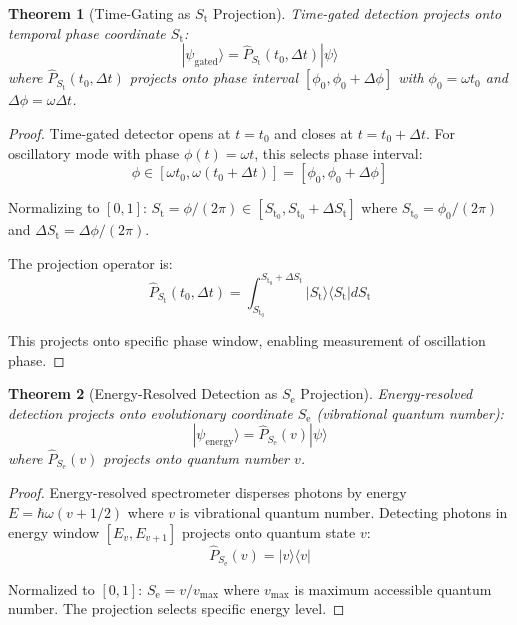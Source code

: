 \documentclass[twocolumn,10pt]{article}
\newtheorem{theorem}{Theorem}[section]
\newcommand{\St}{S_{\text{t}}}
\newcommand{\Se}{S_{\text{e}}}
\begin{document}
\begin{theorem}[Time-Gating as $\St$ Projection]
\label{thm:time_gating_projection}
Time-gated detection projects onto temporal phase coordinate $\St$:
\begin{equation}
|\psi_{\text{gated}}\rangle = \hat{P}_{\St}(t_0, \Delta t) |\psi\rangle
\end{equation}
where $\hat{P}_{\St}(t_0, \Delta t)$ projects onto phase interval $[\phi_0, \phi_0 + \Delta\phi]$ with $\phi_0 = \omega t_0$ and $\Delta\phi = \omega \Delta t$.
\end{theorem}

\begin{proof}
Time-gated detector opens at $t = t_0$ and closes at $t = t_0 + \Delta t$. For oscillatory mode with phase $\phi(t) = \omega t$, this selects phase interval:
\begin{equation}
\phi \in [\omega t_0, \omega(t_0 + \Delta t)] = [\phi_0, \phi_0 + \Delta\phi]
\end{equation}

Normalizing to $[0,1]$: $\St = \phi/(2\pi) \in [\St_0, \St_0 + \Delta\St]$ where $\St_0 = \phi_0/(2\pi)$ and $\Delta\St = \Delta\phi/(2\pi)$.

The projection operator is:
\begin{equation}
\hat{P}_{\St}(t_0, \Delta t) = \int_{\St_0}^{\St_0 + \Delta\St} |\St\rangle\langle\St| d\St
\end{equation}

This projects onto specific phase window, enabling measurement of oscillation phase.
\end{proof}

\begin{theorem}[Energy-Resolved Detection as $\Se$ Projection]
\label{thm:energy_projection}
Energy-resolved detection projects onto evolutionary coordinate $\Se$ (vibrational quantum number):
\begin{equation}
|\psi_{\text{energy}}\rangle = \hat{P}_{\Se}(v) |\psi\rangle
\end{equation}
where $\hat{P}_{\Se}(v)$ projects onto quantum number $v$.
\end{theorem}

\begin{proof}
Energy-resolved spectrometer disperses photons by energy $E = \hbar\omega(v + 1/2)$ where $v$ is vibrational quantum number. Detecting photons in energy window $[E_v, E_{v+1}]$ projects onto quantum state $v$:
\begin{equation}
\hat{P}_{\Se}(v) = |v\rangle\langle v|
\end{equation}

Normalized to $[0,1]$: $\Se = v/v_{\max}$ where $v_{\max}$ is maximum accessible quantum number. The projection selects specific energy level.
\end{proof}
\end{document}
